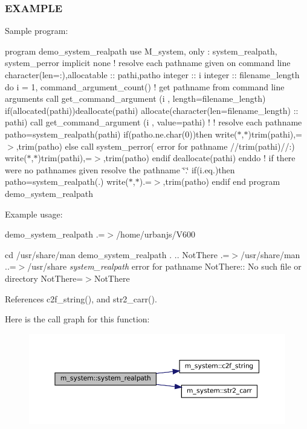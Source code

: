 \subsubsection*{E\+X\+A\+M\+P\+LE}

Sample program\+:

program demo\+\_\+system\+\_\+realpath use M\+\_\+system, only \+: system\+\_\+realpath, system\+\_\+perror implicit none ! resolve each pathname given on command line character(len=\+:),allocatable \+:\+: pathi,patho integer \+:\+: i integer \+:\+: filename\+\_\+length do i = 1, command\+\_\+argument\+\_\+count() ! get pathname from command line arguments call get\+\_\+command\+\_\+argument (i , length=filename\+\_\+length) if(allocated(pathi))deallocate(pathi) allocate(character(len=filename\+\_\+length) \+:\+: pathi) call get\+\_\+command\+\_\+argument (i , value=pathi) ! ! resolve each pathname patho=system\+\_\+realpath(pathi) if(patho.\+ne.\+char(0))then write($\ast$,$\ast$)trim(pathi),\textquotesingle{}=$>$\textquotesingle{},trim(patho) else call system\+\_\+perror( error for pathname \textquotesingle{}//trim(pathi)//\textquotesingle{}\+:\textquotesingle{}) write($\ast$,$\ast$)trim(pathi),\textquotesingle{}=$>$\textquotesingle{},trim(patho) endif deallocate(pathi) enddo ! if there were no pathnames given resolve the pathname \char`\"{}.\char`\"{} if(i.\+eq.)then patho=system\+\_\+realpath(\textquotesingle{}.\textquotesingle{}) write($\ast$,$\ast$)\textquotesingle{}.=$>$\textquotesingle{},trim(patho) endif end program demo\+\_\+system\+\_\+realpath

Example usage\+:

demo\+\_\+system\+\_\+realpath .=$>$/home/urbanjs/\+V600

cd /usr/share/man demo\+\_\+system\+\_\+realpath . .. Not\+There .=$>$/usr/share/man ..=$>$/usr/share {\itshape system\+\_\+realpath} error for pathname Not\+There\+:\+: No such file or directory Not\+There=$>$Not\+There 

References c2f\+\_\+string(), and str2\+\_\+carr().

Here is the call graph for this function\+:\nopagebreak
\begin{figure}[H]
\begin{center}
\leavevmode
\includegraphics[width=350pt]{namespacem__system_a70bbfa0a0be084b9717cbc04408041fc_cgraph}
\end{center}
\end{figure}
\mbox{\label{namespacem__system_a7fa10b991ae066609b687423918cff52}} 
